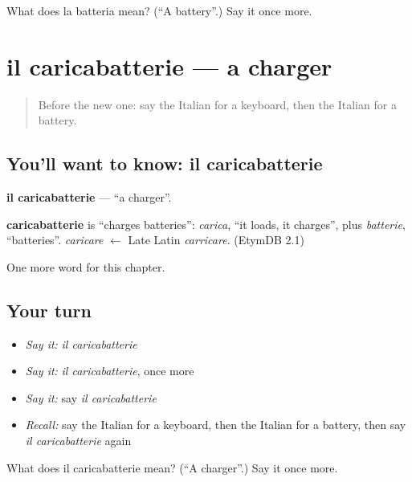 \begin{tcolorbox}[breakable,colback=teal!4,colframe=teal!35!black,title={Before you move on}]
What does la batteria mean? (\textquotedblleft{}A battery\textquotedblright{}.) Say it once more.
\end{tcolorbox}
\section[il caricabatterie]{il caricabatterie — a charger}

\label{lesson:IT-C162-caricabatterie}



\begin{quote}
Before the new one: say the Italian for a keyboard, then the Italian for a battery.
\end{quote}

\subsection*{You'll want to know: il caricabatterie}
\textbf{il caricabatterie} — \textquotedblleft{}a charger\textquotedblright{}.

\begin{cousinweb}
\textbf{caricabatterie} is \textquotedblleft{}charges batteries\textquotedblright{}: \emph{carica}, \textquotedblleft{}it loads, it charges\textquotedblright{}, plus \emph{batterie}, \textquotedblleft{}batteries\textquotedblright{}. \emph{caricare} $\leftarrow$ Late Latin \emph{carricare}. (EtymDB 2.1)
\end{cousinweb}

\begin{grammarlens}[title={What you've built}]
One more word for this chapter.
\end{grammarlens}

\subsection*{Your turn}
\begin{itemize}
\raggedright
  \item \emph{Say it:} \emph{il caricabatterie}
  \item \emph{Say it:} \emph{il caricabatterie}, once more
  \item \emph{Say it:} say \emph{il caricabatterie}
  \item \emph{Recall:} say the Italian for a keyboard, then the Italian for a battery, then say \emph{il caricabatterie} again
\end{itemize}

\begin{tcolorbox}[breakable,colback=teal!4,colframe=teal!35!black,title={Before you move on}]
What does il caricabatterie mean? (\textquotedblleft{}A charger\textquotedblright{}.) Say it once more.
\end{tcolorbox}
